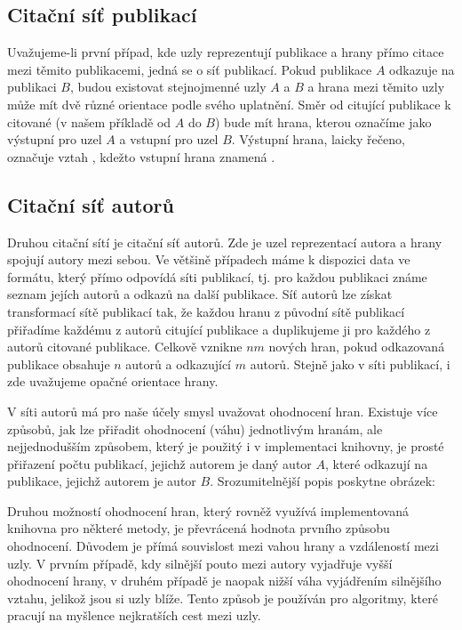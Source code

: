\documentclass{bakalarka}
\begin{document}
\subsection{Citační síť publikací}
Uvažujeme-li první případ, kde uzly reprezentují publikace a hrany přímo citace
mezi těmito publikacemi, jedná se o síť publikací. Pokud publikace $A$ odkazuje
na publikaci $B$, budou existovat stejnojmenné uzly $A$ a $B$ a hrana mezi
těmito uzly může mít dvě různé orientace podle svého uplatnění. Směr od
citující publikace k citované (v našem příkladě od $A$ do $B$) bude mít hrana,
kterou označíme jako výstupní pro uzel $A$ a vstupní pro uzel $B$.  Výstupní
hrana, laicky řečeno, označuje vztah , kdežto vstupní hrana znamená
.

\subsection{Citační síť autorů}
Druhou citační sítí je citační síť autorů. Zde je uzel reprezentací autora a
hrany spojují autory mezi sebou. Ve většině případech máme k dispozici data ve
formátu, který přímo odpovídá síti publikací, tj. pro každou publikaci známe
seznam jejích autorů a odkazů na další publikace. Síť autorů lze získat
transformací sítě publikací tak, že každou hranu z původní sítě publikací
přiřadíme každému z autorů citující publikace a duplikujeme ji pro každého z
autorů citované publikace. Celkově vznikne $nm$ nových hran, pokud odkazovaná
publikace obsahuje $n$ autorů a odkazující $m$ autorů. Stejně jako v síti
publikací, i zde uvažujeme opačné orientace hrany.

V síti autorů má pro naše účely smysl uvažovat ohodnocení hran. Existuje více
způsobů, jak lze přiřadit ohodnocení (váhu) jednotlivým hranám, ale
nejjednodušším způsobem, který je použitý i v implementaci knihovny, je prosté
přiřazení počtu publikací, jejichž autorem je daný autor $A$, které odkazují na
publikace, jejichž autorem je autor $B$. Srozumitelnější popis poskytne
obrázek:

Druhou možností ohodnocení hran, který rovněž využívá implementovaná knihovna
pro některé metody, je převrácená hodnota prvního způsobu ohodnocení. Důvodem
je přímá souvislost mezi vahou hrany a vzdáleností mezi uzly. V prvním případě,
kdy silnější pouto mezi autory vyjadřuje vyšší ohodnocení hrany, v druhém
případě je naopak nižší váha vyjádřením silnějšího vztahu, jelikož jsou si uzly
blíže. Tento způsob je používán pro algoritmy, které pracují na myšlence
nejkratších cest mezi uzly. 
\end{document}
